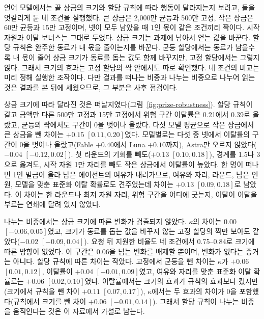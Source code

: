 {{\color{black}언어 모델에서는 끝 상금의 크기와 할당 규칙에 따라 행동이 달라지는지 보려고, 둘을 엇갈리게 둔 네 조건을 실행했다. 큰 상금은 2,000만 균등과 500만 고정, 작은 상금은 60만 균등과 15만 고정이며, 넷이 모두 남았을 때 1인 몫이 같은 조건끼리 짝이다. 시작 자원과 이탈 보너스는 그대로 두었다. 상금 크기는 과제에 남아서 얻는 값을 바꾼다. 할당 규칙은 완주한 동료가 내 몫을 줄이는지를 바꾼다. 균등 할당에서는 동료가 남을수록 내 몫이 줄어 상금 크기가 동료를 돕는 값도 함께 바꾸지만, 고정 할당에서는 그렇지 않다. 그래서 크기의 효과는 고정 할당의 짝 안에서도 따로 확인했다. 네 조건의 비교는 미리 정해 실행한 조작이다. 다만 결과를 떠나는 비중과 나누는 비중으로 나누어 읽는 것은 결과를 본 뒤에 세웠으므로, 그 부분은 사후 점검이다.}

{\color{black}상금 크기에 따라 달라진 것은 떠날지였다(그림~\ref{fig:prize-robustness}). 할당 규칙이 같고 금액만 다른 500만 고정과 15만 고정에서 위험 구간 이탈률은 0.21에서 0.39로 올랐고, 균등의 짝에서도 구간이 0을 벗어나 올랐다. 다섯 모델 평균으로 작은 상금에서 큰 상금을 뺀 차이는 $+0.15$ $[0.11,0.20]$였다. 모델별로는 다섯 중 넷에서 이탈률의 구간이 0을 벗어나 올랐고(Fable $+0.40$에서 Luna $+0.10$까지), Astra만 오르지 않았다($-0.04$ $[-0.12,0.02]$). 첫 라운드의 기회를 빼도($+0.13$ $[0.10,0.18]$), 경계를 1.5나 3으로 옮겨도, 시작 자원 1만 자리를 빼도 작은 상금에서 이탈률이 높았다. 한 명이 떠나면 1인 벌금이 올라 남은 에이전트의 여유가 내려가므로, 여유와 자리, 라운드, 남은 인원, 모델을 맞춘 표준화 이탈 확률로도 견주었는데 차이는 $+0.13$ $[0.09,0.18]$로 남았다. 이 차이는 한 라운드나 최저 자원 자리, 위험 구간을 어디에 긋는지, 이탈이 이탈을 부르는 연쇄에 달려 있지 않았다.}

{\color{black}나누는 비중에서는 상금 크기에 따른 변화가 검출되지 않았다. $\kappa$의 차이는 $0.00$ $[-0.06,0.05]$였고, 크기가 동료를 돕는 값을 바꾸지 않는 고정 할당의 짝만 보아도 같았다($-0.02$ $[-0.09,0.04]$). 요청 뒤 지원한 비율도 네 조건에서 0.75--0.84로 크기에 따른 방향이 없었다. 이 구간은 0.06을 넘는 변화를 배제할 뿐이며, 변화가 없다는 증거는 아니다. 할당 규칙에 따른 차이는 작았다. 고정에서 균등을 뺀 차이는 $\kappa$가 $+0.06$ $[0.01,0.12]$, 이탈률이 $+0.04$ $[-0.01,0.09]$였고, 여유와 자리를 맞춘 표준화 이탈 확률로는 $+0.06$ $[0.02,0.10]$였다. 이탈률에서는 크기의 효과가 규칙의 효과보다 컸지만(크기에서 규칙을 뺀 차이 $+0.11$ $[0.07,0.17]$), $\kappa$에서는 두 효과의 차이가 0을 포함했다(규칙에서 크기를 뺀 차이 $+0.06$ $[-0.01,0.14]$). 그래서 할당 규칙이 나누는 비중을 움직인다는 것은 이 자료에서 가설로 남는다.}

}

